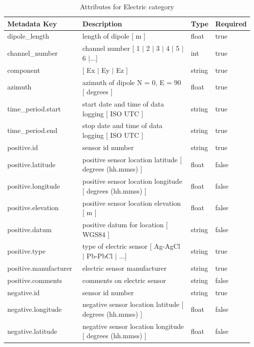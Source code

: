 \documentclass{article}
\begin{document}
\begin{table}[htb!]
    \caption[Attributes for Electric Channel]{Attributes for Electric category}
    \begin{tabular}{|l|p{3in}|l|l|}
        \hline
        \textbf{Metadata Key} & \textbf{Description} & \textbf{Type} & \textbf{Required} \\ \hline
        dipole\_length\ & length of dipole [ m ] & float & true \\ \hline
        channel\_number\ & channel number [ 1 $|$ 2 $|$ 3 $|$ 4 $|$ 5 $|$ 6 $|$...] & int & true \\ \hline
        component\ & [ Ex $|$ Ey $|$ Ez ] & string  & true \\ \hline
        azimuth\ & azimuth of dipole N = 0,  E = 90 [ degrees ] & float & true \\ \hline
        time\_period.start\ & start date and time of data logging [ ISO UTC ] & string & true \\ \hline
        time\_period.end\ & stop date and time of data logging [ ISO UTC ] & string & true \\ \hline
        positive.id\ & sensor id number & string & true \\ \hline
        positive.latitude\ & positive sensor location latitude [ degrees (hh.mmss) ] & float & false \\ \hline
        positive.longitude\ & positive sensor location longitude [ degrees (hh.mmss) ] & float & false \\ \hline
        positive.elevation\ & positive sensor location elevation [ m ] & float & false \\ \hline
        positive.datum\ & positive datum for location [ WGS84 ] & string & false \\ \hline
        positive.type\ & type of electric sensor [ Ag-AgCl $|$ Pb-PbCl $|$ ...] & string & true \\ \hline
        positive.manufacturer\ & electric sensor manufacturer & string & true \\ \hline
        positive.comments\ & comments on electric sensor & string & false \\ \hline
        negative.id\ & sensor id number & string & true \\ \hline
        negative.longitude\ & negative sensor location latitude [ degrees (hh.mmss) ] & float & false \\ \hline
        negative.latitude\ & negative sensor location longitude [ degrees (hh.mmss) ] & float & false \\ \hline

\end{tabular}
\end{table}
\end{document}
